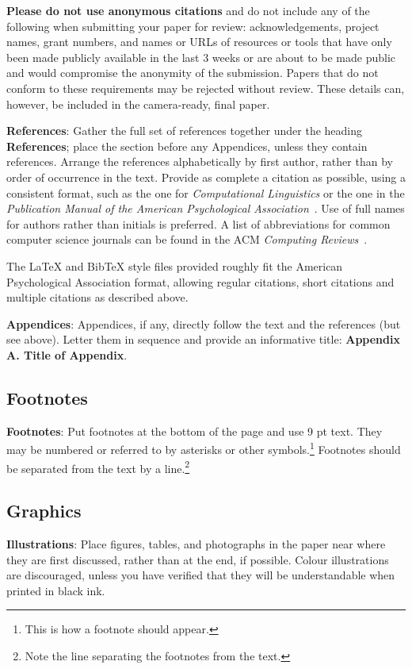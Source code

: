 \textbf{Please do not use anonymous citations} and do not include
any of the following when submitting your paper for review:
acknowledgements, project names, grant numbers, and names or URLs of
resources or tools that have only been made publicly available in
the last 3 weeks or are about to be made public and would compromise the anonymity of the submission.
Papers that do not
conform to these requirements may be rejected without review.
These details can, however, be included in the camera-ready, final paper.

\textbf{References}: Gather the full set of references together under
the heading {\bf References}; place the section before any Appendices,
unless they contain references. Arrange the references alphabetically
by first author, rather than by order of occurrence in the text.
Provide as complete a citation as possible, using a consistent format,
such as the one for {\em Computational Linguistics\/} or the one in the 
{\em Publication Manual of the American 
Psychological Association\/}~\cite{APA:83}.  Use of full names for
authors rather than initials is preferred.  A list of abbreviations
for common computer science journals can be found in the ACM 
{\em Computing Reviews\/}~\cite{ACM:83}.

The \LaTeX{} and Bib\TeX{} style files provided roughly fit the
American Psychological Association format, allowing regular citations, 
short citations and multiple citations as described above.

{\bf Appendices}: Appendices, if any, directly follow the text and the
references (but see above).  Letter them in sequence and provide an
informative title: {\bf Appendix A. Title of Appendix}.

\subsection{Footnotes}

{\bf Footnotes}: Put footnotes at the bottom of the page and use 9 pt
text. They may be numbered or referred to by asterisks or other
symbols.\footnote{This is how a footnote should appear.} Footnotes
should be separated from the text by a line.\footnote{Note the line
separating the footnotes from the text.}

\subsection{Graphics}

{\bf Illustrations}: Place figures, tables, and photographs in the
paper near where they are first discussed, rather than at the end, if
possible. 
Colour
illustrations are discouraged, unless you have verified that  
they will be understandable when printed in black ink.

